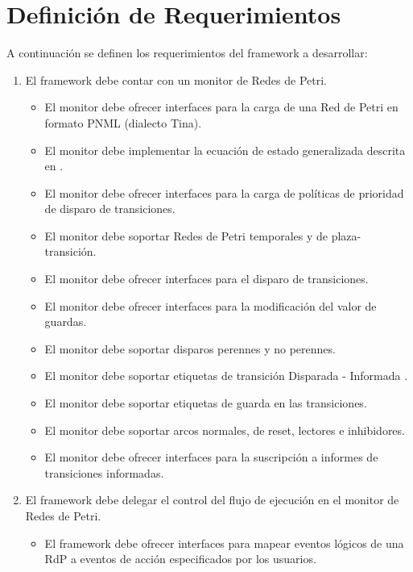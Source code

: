 \section{Definición de Requerimientos}
A continuación se definen los requerimientos del framework a desarrollar:
\begin{enumerate}
    \item El framework debe contar con un monitor de Redes de Petri.
        \begin{itemize}
          \item El monitor debe ofrecer interfaces para la carga de una Red de
          Petri en formato PNML (dialecto Tina).
          \item El monitor debe implementar la ecuación de estado generalizada
          descrita en \cite{Ecuacion_generalizada_LAC}.
          \item El monitor debe ofrecer interfaces para la carga de políticas de
          prioridad de disparo de transiciones.
          \item El monitor debe soportar Redes de Petri temporales y de
          plaza-transición.
          \item El monitor debe ofrecer interfaces para el disparo de
          transiciones.
          \item El monitor debe ofrecer interfaces para la modificación del
          valor de guardas.
          \item El monitor debe soportar disparos perennes y no perennes.
          \item El monitor debe soportar etiquetas de transición Disparada -
          Informada \cite{codegen}.
          \item El monitor debe soportar etiquetas de guarda en las
          transiciones.
          \item El monitor debe soportar arcos normales, de reset, lectores e
          inhibidores.
          \item El monitor debe ofrecer interfaces para la suscripción a
          informes de transiciones informadas.
        \end{itemize}
    \item El framework debe delegar el control del flujo de ejecución en el
    monitor de Redes de Petri.
        \begin{itemize}
            \item El framework debe ofrecer interfaces para mapear eventos lógicos
            de una RdP a eventos de acción especificados por los usuarios.

\end{itemize}
\end{enumerate}
